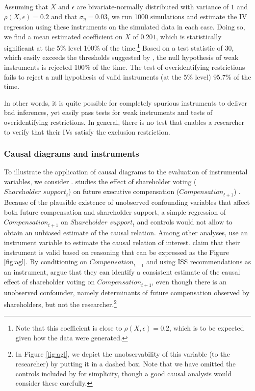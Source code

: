 \documentclass[11pt,reqno,titlepage]{amsart}
\begin{document}
\begin{doublespace}
Assuming that $X$ and $\epsilon$ are bivariate-normally distributed with variance of $1$ and $\rho(X, \epsilon)=0.2$ and that $\sigma_{\eta}=0.03$, we run 1000 simulations and  estimate the IV regression using these instruments on the simulated data in each case.
Doing so, we find a mean estimated coefficient on $X$ of $0.201$, which is statistically significant at the 5\% level 100\% of the time.\footnote{Note that this coefficient is close to $\rho(X, \epsilon) = 0.2$, which is to be expected given how the data were generated.} 
Based on a test statistic of 30, which easily exceeds the thresholds suggested by \citet{Stock:2002aa}, the null hypothesis of weak instruments is rejected 100\% of the time. 
The test of overidentifying restrictions fails to reject a null hypothesis of valid instruments (at the 5\% level) 95.7\% of the time.

In other words, it is quite possible for completely spurious instruments to deliver bad inferences, yet easily pass tests for weak instruments and tests of overidentifying restrictions.
In general, there is no test that enables a researcher to verify that their IVs satisfy the exclusion restriction.

\subsubsection{Causal diagrams and instruments}
To illustrate the application of causal diagrams to the evaluation of instrumental variables, we consider \citet{Armstrong:2013io}.
%
\citet{Armstrong:2013io} studies the effect of shareholder voting ($\textit{Shareholder support}_{t}$) on future executive compensation ($\textit{Compensation}_{t+1}$) .
Because of the plausible existence of unobserved confounding variables that affect both future compensation and shareholder support, a simple regression of $\textit{Compensation}_{t+1}$ on $\textit{Shareholder support}_{t}$ and controls would not allow \citet{Armstrong:2013io} to obtain an unbiased estimate of the causal relation.
Among other analyses, \citet{Armstrong:2013io} use an instrument variable to estimate the causal relation of interest.
\citet{Armstrong:2013io} claim that their instrument is valid based on reasoning that can be expressed as the  Figure \ref{fig:agl}.
By conditioning on $\textit{Compensation}_{t-1}$ and using ISS recommendations as an instrument, \citet{Armstrong:2013io} argue that they can identify a consistent estimate of the causal effect of shareholder voting on $\textit{Compensation}_{t+1}$, even though there is an unobserved confounder, namely determinants of future compensation observed by shareholders, but not the researcher.\footnote{
In Figure \ref{fig:agl}, we depict the unobservability of this variable (to the researcher) by putting it in a dashed box.
Note that we have omitted the controls included by \citet{Armstrong:2013io} for simplicity, though a good causal analysis would consider these carefully.}


\end{doublespace}
\end{document}
